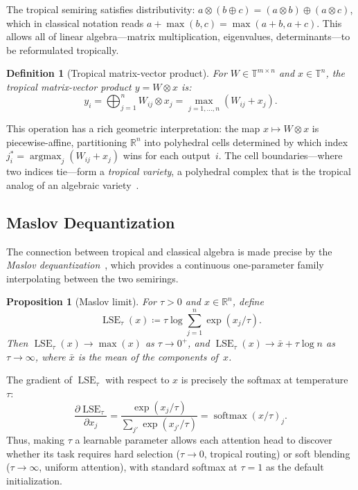 \documentclass[11pt,twocolumn]{article}
\newtheorem{proposition}[theorem]{Proposition}
\newtheorem{definition}[theorem]{Definition}
\newcommand{\R}{\mathbb{R}}
\newcommand{\T}{\mathbb{T}}
\newcommand{\tropplus}{\oplus}
\newcommand{\tropmult}{\otimes}
\newcommand{\lse}{\operatorname{LSE}}
\newcommand{\softmax}{\operatorname{softmax}}
\newcommand{\argmax}{\operatorname{argmax}}
\begin{document}
The tropical semiring satisfies distributivity:
$a \tropmult (b \tropplus c) = (a \tropmult b) \tropplus (a \tropmult c)$,
which in classical notation reads
$a + \max(b,c) = \max(a+b, a+c)$.
This allows all of linear algebra---matrix multiplication, eigenvalues,
determinants---to be reformulated tropically.

\begin{definition}[Tropical matrix-vector product]
For $W \in \T^{m \times n}$ and $x \in \T^n$, the tropical matrix-vector
product $y = W \tropmult x$ is:
\begin{equation}\label{eq:trop-matvec}
  y_i = \bigoplus_{j=1}^n W_{ij} \tropmult x_j = \max_{j=1,\ldots,n}(W_{ij} + x_j).
\end{equation}
\end{definition}

This operation has a rich geometric interpretation: the map $x \mapsto W
\tropmult x$ is piecewise-affine, partitioning $\R^n$ into polyhedral cells
determined by which index $j^*_i = \argmax_j(W_{ij} + x_j)$ wins for each
output~$i$. The cell boundaries---where two indices tie---form a
\emph{tropical variety}, a polyhedral complex that is the tropical analog of
an algebraic variety~\cite{maclagan2015introduction}.

\subsection{Maslov Dequantization}\label{sec:maslov}

The connection between tropical and classical algebra is made precise by the
\emph{Maslov dequantization}~\cite{litvinov2007maslov}, which provides a
continuous one-parameter family interpolating between the two semirings.

\begin{proposition}[Maslov limit]\label{prop:maslov}
For $\tau > 0$ and $x \in \R^n$, define
\begin{equation}\label{eq:lse}
  \lse_\tau(x) \coloneqq \tau \log \sum_{j=1}^n \exp(x_j / \tau).
\end{equation}
Then $\lse_\tau(x) \to \max(x)$ as $\tau \to 0^+$, and
$\lse_\tau(x) \to \bar{x} + \tau \log n$ as $\tau \to \infty$, where
$\bar{x}$ is the mean of the components of~$x$.
\end{proposition}

The gradient of $\lse_\tau$ with respect to $x$ is precisely the softmax at
temperature $\tau$:
\begin{equation}\label{eq:softmax-grad}
  \frac{\partial \lse_\tau}{\partial x_j} = \frac{\exp(x_j/\tau)}{\sum_{j'}\exp(x_{j'}/\tau)}
  = \softmax(x/\tau)_j.
\end{equation}
Thus, making $\tau$ a learnable parameter allows each attention head to
discover whether its task requires hard selection ($\tau \to 0$, tropical
routing) or soft blending ($\tau \to \infty$, uniform attention), with
standard softmax at $\tau = 1$ as the default initialization.
\end{document}
